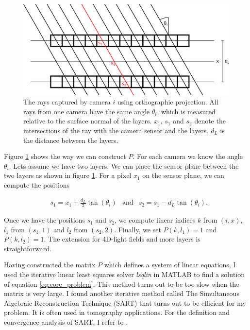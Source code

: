 \documentclass[11pt,a4paper,titlepage]{article}
\begin{document}
\begin{figure}[h]
	\centering
	\includegraphics[scale=0.5]{sketches/layers_orthographic_rays.png} 
	\caption{The rays captured by camera $i$ using orthographic projection. All rays from one camera have the same angle $\theta_i$, which is measured relative to the surface normal of the layers. $x_1$, $s_1$ and $s_2$ denote the intersections of the ray with the camera sensor and the layers. $d_L$ is the distance between the layers.}
	\label{fig:orthographic_cameras_layers_sketch}
\end{figure}

Figure \ref{fig:orthographic_cameras_layers_sketch} shows the way we can construct $P$. For each camera we know the angle $\theta_i$. Lets assume we have two layers. We can place the sensor plane between the two layers as shown in figure \ref{fig:orthographic_cameras_layers_sketch}. For a pixel $x_1$ on the sensor plane, we can compute the positions

\begin{align*}
	& s_1 = x_1 + \frac{d_L}{2}\tan\left( \theta_i \right) & \text{and} & s_2 = s_1 - d_L \tan\left( \theta_i \right) \text{.}
\end{align*}

Once we have the positions $s_1$ and $s_2$, we compute linear indices $k$ from $\left(i, x\right)$, $l_1$ from $\left(s_1, 1\right)$ and $l_2$ from $\left(s_2, 2\right)$. Finally, we set $P\left(k, l_1\right) = 1$ and $P\left(k, l_2\right) = 1$. The extension for 4D-light fields and more layers is straightforward.

Having constructed the matrix $P$ which defines a system of linear equations, I used the iterative  linear least squares solver \emph{lsqlin} in MATLAB to find a solution of equation \ref{eq:core_problem}. This method turns out to be too slow when the matrix is very large. I found another iterative method called The Simultaneous Algebraic Reconstruction Technique (SART) that turns out to be efficient for my problem. It is often used in tomography applications. For the definition and convergence analysis of SART, I refer to \cite{CONV_SART}. 
\end{document}
